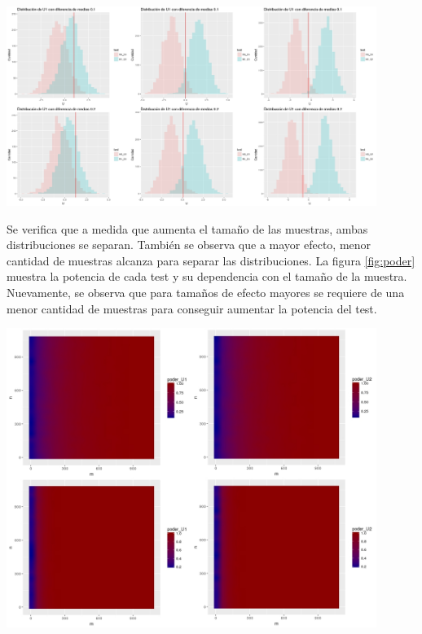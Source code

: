 \documentclass[%
 reprint,
 amsmath,amssymb,
 aps,
spanish]{revtex4-1}
\begin{document}
\begin{minipage}{0.45\textwidth}									
\centering
\includegraphics[width=0.9\textwidth]{imagenes/histograma_U1}
    \label{fig:histogramas_poder}
\end{minipage}

Se verifica que a medida que aumenta el tamaño de las muestras, ambas distribuciones se separan. También se observa que a mayor efecto, menor cantidad de muestras alcanza para separar las 
distribuciones. La figura \ref{fig:poder} muestra la potencia de cada test y su dependencia con el tamaño de la muestra. Nuevamente, se observa que para tamaños de efecto mayores se requiere de una 
menor 
cantidad de muestras para conseguir aumentar la potencia del test.

\begin{minipage}{0.45\textwidth}									
\centering
\includegraphics[width=0.9\textwidth]{imagenes/poder}
    \label{fig:poder}
\end{minipage}
\end{document}
